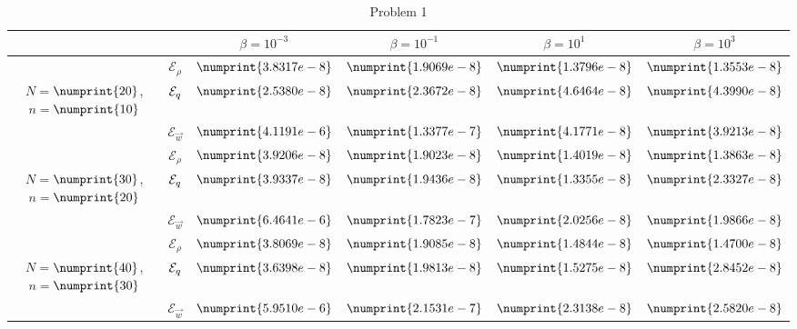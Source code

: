 \begin{table}
\begin{tabular}{ ||c|| c | c | c | c | c ||}
\hline
& & $\beta = 10^{-3}$ & $\beta = 10^{-1}$ & $\beta = 10^{1}$ & $\beta = 10^{3}$  \\
\hline
 & $\mathcal{E}_\rho$ & $\numprint{3.8317e-8}$ & $\numprint{1.9069e-8}$ & $\numprint{1.3796e-8}$ & $\numprint{1.3553e-8}$ \\
 $N = $$\numprint{20}$, $n = $$\numprint{10}$  & $\mathcal{E}_q$ & $\numprint{2.5380e-8}$ & $\numprint{2.3672e-8}$ & $\numprint{4.6464e-8}$ & $\numprint{4.3990e-8}$ \\
& $\mathcal{E}_{\vec{w}}$ & $\numprint{4.1191e-6}$ & $\numprint{1.3377e-7}$ & $\numprint{4.1771e-8}$ & $\numprint{3.9213e-8}$ \\
\hline
 & $\mathcal{E}_\rho$ & $\numprint{3.9206e-8}$ & $\numprint{1.9023e-8}$ & $\numprint{1.4019e-8}$ & $\numprint{1.3863e-8}$ \\
 $N = $$\numprint{30}$, $n = $$\numprint{20}$  & $\mathcal{E}_q$ & $\numprint{3.9337e-8}$ & $\numprint{1.9436e-8}$ & $\numprint{1.3355e-8}$ & $\numprint{2.3327e-8}$ \\
& $\mathcal{E}_{\vec{w}}$ & $\numprint{6.4641e-6}$ & $\numprint{1.7823e-7}$ & $\numprint{2.0256e-8}$ & $\numprint{1.9866e-8}$ \\
\hline
 & $\mathcal{E}_\rho$ & $\numprint{3.8069e-8}$ & $\numprint{1.9085e-8}$ & $\numprint{1.4844e-8}$ & $\numprint{1.4700e-8}$ \\
 $N = $$\numprint{40}$, $n = $$\numprint{30}$  & $\mathcal{E}_q$ & $\numprint{3.6398e-8}$ & $\numprint{1.9813e-8}$ & $\numprint{1.5275e-8}$ & $\numprint{2.8452e-8}$ \\
& $\mathcal{E}_{\vec{w}}$ & $\numprint{5.9510e-6}$ & $\numprint{2.1531e-7}$ & $\numprint{2.3138e-8}$ & $\numprint{2.5820e-8}$ \\
\hline
\end{tabular}
\caption{Problem 1}
\label{TabA1:Prob1}
\end{table}